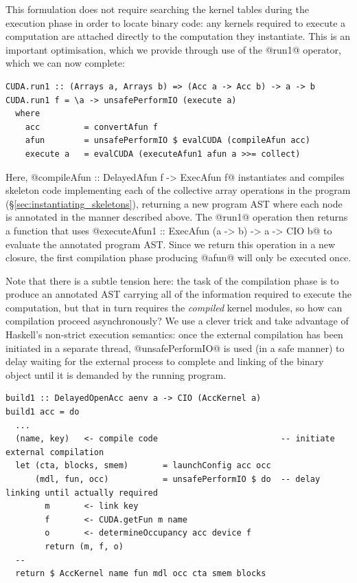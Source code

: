 This formulation does not require searching the kernel tables during the
execution phase in order to locate binary code: any kernels required to execute
a computation are attached directly to the computation they instantiate. This is
an important optimisation, which we provide through use of the @run1@
operator, which we can now complete:
%
\begin{lstlisting}[style=haskell]
CUDA.run1 :: (Arrays a, Arrays b) => (Acc a -> Acc b) -> a -> b
CUDA.run1 f = \a -> unsafePerformIO (execute a)
  where
    acc         = convertAfun f
    afun        = unsafePerformIO $ evalCUDA (compileAfun acc)
    execute a   = evalCUDA (executeAfun1 afun a >>= collect)
\end{lstlisting}
%
Here, @compileAfun :: DelayedAfun f -> ExecAfun f@ instantiates and
compiles skeleton code implementing each of the collective array operations in
the program (\S\ref{sec:instantiating_skeletons}), returning a new program AST
where each node is annotated in the manner described above. The @run1@
operation then returns a function that uses
@executeAfun1 :: ExecAfun (a -> b) -> a -> CIO b@
to evaluate the annotated program AST. Since we return this operation in a new
closure, the first compilation phase producing @afun@ will only be executed
once.

Note that there is a subtle tension here: the task of the compilation phase is
to produce an annotated AST carrying all of the information required to execute
the computation, but that in turn requires the \emph{compiled} kernel modules,
so how can compilation proceed asynchronously? We use a clever trick and take
advantage of Haskell's non-strict execution semantics: once the external
compilation has been initiated in a separate thread, @unsafePerformIO@ is
used (in a safe manner) to delay waiting for the external process to complete
and linking of the binary object until it is demanded by the running program.
%
\begin{lstlisting}[style=haskell]
build1 :: DelayedOpenAcc aenv a -> CIO (AccKernel a)
build1 acc = do
  ...
  (name, key)   <- compile code                         -- initiate external compilation
  let (cta, blocks, smem)       = launchConfig acc occ
      (mdl, fun, occ)           = unsafePerformIO $ do  -- delay linking until actually required
        m       <- link key
        f       <- CUDA.getFun m name
        o       <- determineOccupancy acc device f
        return (m, f, o)
  --
  return $ AccKernel name fun mdl occ cta smem blocks
\end{lstlisting}


